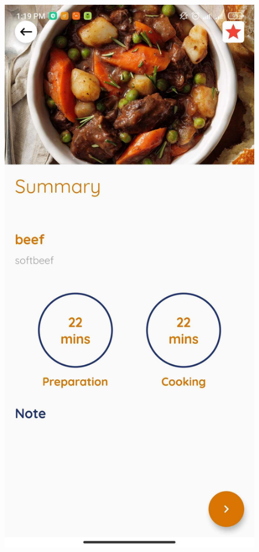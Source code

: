 \documentclass{article}
\begin{document}
    \begin{figure}[h!]
    \centering
    \includegraphics[scale=0.1]{Images/AddToFavorite.jpg}

\end{figure}
\end{document}
